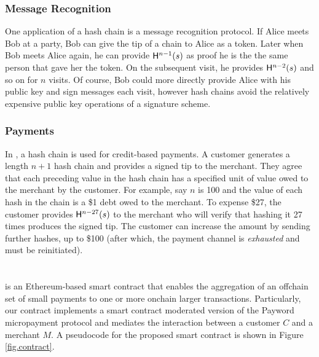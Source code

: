 \subsubsection{Message Recognition}

One application of a hash chain is a message recognition protocol. If Alice meets Bob at a party, Bob can give the tip of a chain to Alice as a token. Later when Bob meets Alice again, he can provide $\mathsf{H}^{n-1}(s)$ as proof he is the the same person that gave her the token. On the subsequent visit, he provides $\mathsf{H}^{n-2}(s)$ and so on for $n$ visits. Of course, Bob could more directly provide Alice with his public key and sign messages each visit, however hash chains avoid the relatively expensive public key operations of a signature scheme. 

\subsubsection{Payments}

In \pw, a hash chain is used for credit-based payments. A customer generates a length $n+1$ hash chain and provides a signed tip to the merchant. They agree that each preceding value in the hash chain has a specified unit of value owed to the merchant by the customer. For example, say $n$ is 100 and the value of each hash in the chain is a \$1 debt owed to the merchant. To expense \$27, the customer provides $\mathsf{H}^{n-27}(s)$ to the merchant who will verify that hashing it 27 times produces the signed tip. The customer can increase the amount by sending further hashes, up to \$100 (after which, the payment channel is \textit{exhausted} and must be reinitiated).


\section{\ew}

\ew is an Ethereum-based smart contract that enables the aggregation of an offchain set of small payments to one or more onchain larger transactions. Particularly, our contract implements a smart contract moderated version of the Payword micropayment protocol and mediates the interaction between a customer $C$ and a merchant $M$. A pseudocode for the proposed smart contract is shown in Figure \ref{fig.contract}. 

